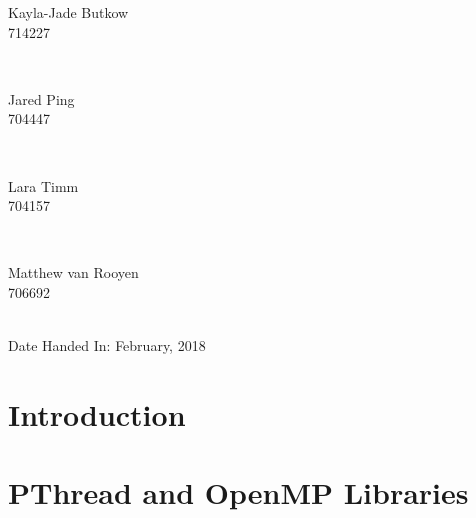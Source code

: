 \documentclass[10pt,twocolumn]{witseiepaper}
\begin{document}
\begin{titlepage}
\begin{minipage}{0.4\textwidth}
	\begin{flushleft} \large
		Kayla-Jade Butkow \\ 714227 %
	\end{flushleft}
\end{minipage}
~
\begin{minipage}{0.4\textwidth}
	\begin{flushright} \large
		Jared Ping \\ 704447
	\end{flushright}
\end{minipage}\\[1cm]

\begin{minipage}{0.4\textwidth}
	\begin{flushleft} \large
		Lara Timm \\ 704157
	\end{flushleft}
\end{minipage}
~
\begin{minipage}{0.4\textwidth}
	\begin{flushright} \large
		Matthew van Rooyen \\ 706692
	\end{flushright}
\end{minipage}\\[1cm]
		
		
	
{\large Date Handed In:  February, 2018}\\[1cm] 
	
\end{titlepage}


\thispagestyle{empty}
\pagestyle{plain}
\setcounter{page}{1}

\section{Introduction}


\section{PThread and OpenMP Libraries}
\end{document}
